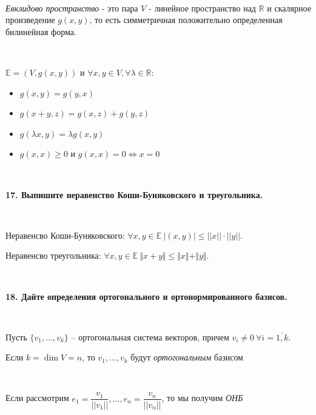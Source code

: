 \documentclass{article}
\begin{document}
	$\;$
	{
		\setlength{\parindent}{0.4cm}
		\hangindent=0.4cm	
		
		\textit{Евклидово пространство} - это пара $V$ - линейное пространство над $\mathbb{R}$ и скалярное произведение $g(x,y)$, то есть симметричная положительно определенная билинейная форма.
		
		$\;$
		
		\setlength{\parindent}{0.8cm}
		\hangindent=0.8cm
		
		$\mathbb{E} = (V, g(x,y))$ и $\forall x, y \in V, \forall \lambda \in \mathbb{R}$:
		
		\begin{itemize}
			
			\item  $g(x,y) = g(y,x)$
			\item  $g(x + y, z) = g(x, z) + g(y, z)$
			\item $g(\lambda x, y) = \lambda g(x, y)$
			\item  $g(x, x) \geq 0$ и $ g(x, x) = 0 \Leftrightarrow x= 0$
			
		\end{itemize}
		
		\setlength{\parindent}{0.4cm}
		\hangindent=0.4cm
		
		$\;$
		\setlength{\parindent}{0cm}
		\hangindent=0cm
	}
	
	\textbf{17. Выпишите неравенство Коши-Буняковского и треугольника.}
	
	$\;$
	{
		\setlength{\parindent}{0.4cm}
		\hangindent=0.4cm
		
		Неравенсво Коши-Буняковского: $\forall x, y \in \mathbb{E} \  |(x, y)|\leq||x||\cdot||y||. $
		
		Неравенсво треугольника: $\forall x, y \in \mathbb{E} \ \Vert x + y \Vert \leq \Vert x \Vert + \Vert y \Vert. $
		
		$\;$
		\setlength{\parindent}{0cm}
		\hangindent=0cm
	}
	
	\textbf{18. Дайте определения ортогонального и ортонормированного базисов.}
	
	$\;$
	{
		\setlength{\parindent}{0.4cm}
		\hangindent=0.4cm
		
		Пусть $\{v_1, \ldots, v_k \}$ -- ортогональная система векторов, причем $v_i\ne0\ \forall i=\overline{1, k}$. 
       
       Если $k=\dim V=n$, то $v_1, \ldots, v_k$ будут \textit{ортогональным} базисом
       
       $\;$
       
       Если рассмотрим $e_1=\dfrac{v_1}{||v_1||}, \ldots, e_n=\dfrac{v_n}{||v_n||}$, то мы получим \textit{ОНБ}\\
		
		$\;$
		\setlength{\parindent}{0cm}
		\hangindent=0cm
	}
	
\end{document}

